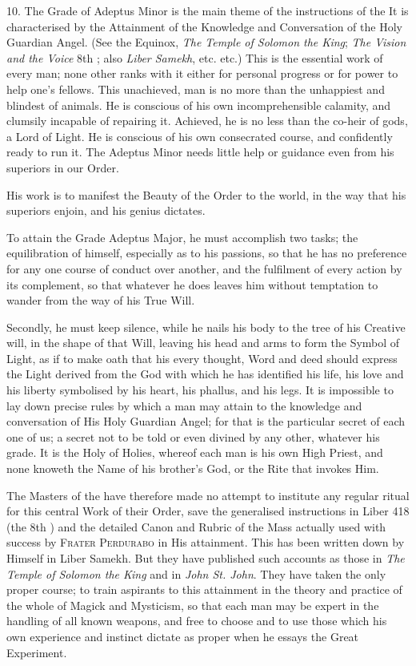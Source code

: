 \vspace{\baselineskip}

10. The Grade of Adeptus Minor is the main theme of the instructions of the \Argentium{} It is characterised by the Attainment of the Knowledge and Conversation of the Holy Guardian Angel. (See the Equinox, \textit{The Temple of Solomon the King}; \textit{The Vision and the Voice} 8th \AEthyr{}; also \textit{Liber Samekh}, etc. etc.) This is the essential work of every man; none other ranks with it either for personal progress or for power to help one's fellows. This unachieved, man is no more than the unhappiest and blindest of animals. He is conscious of his own incomprehensible calamity, and clumsily incapable of repairing it. Achieved, he is no less than the co-heir of gods, a Lord of Light. He is conscious of his own consecrated course, and confidently ready to run it. The Adeptus Minor needs little help or guidance even from his superiors in our Order.

His work is to manifest the Beauty of the Order to the world, in the way that his superiors enjoin, and his genius dictates.

To attain the Grade Adeptus Major, he must accomplish two tasks; the equilibration of himself, especially as to his passions, so that he has no preference for any one course of conduct over another, and the fulfilment of every action by its complement, so that whatever he does leaves him without temptation to wander from the way of his True Will.

Secondly, he must keep silence, while he nails his body to the tree of his Creative will, in the shape of that Will, leaving his head and arms to form the Symbol of Light, as if to make oath that his every thought, Word and deed should express the Light derived from the God with which he has identified his life, his love and his liberty \textemdash{} symbolised by his heart, his phallus, and his legs. It is impossible to lay down precise rules by which a man may attain to the knowledge and conversation of His Holy Guardian Angel; for that is the particular secret of each one of us; a secret not to be told or even divined by any other, whatever his grade. It is the Holy of Holies, whereof each man is his own High Priest, and none knoweth the Name of his brother's God, or the Rite that invokes Him.

The Masters of the \Argentium{} have therefore made no attempt to institute any regular ritual for this central Work of their Order, save the generalised instructions in Liber 418 (the 8th \AEthyr{}) and the detailed Canon and Rubric of the Mass actually used with success by \textsc{Frater Perdurabo} in His attainment. This has been written down by Himself in Liber Samekh. But they have published such accounts as those in \textit{The Temple of Solomon the King} and in \textit{John St. John}. They have taken the only proper course; to train aspirants to this attainment in the theory and practice of the whole of Magick and Mysticism, so that each man may be expert in the handling of all known weapons, and free to choose and to use those which his own experience and instinct dictate as proper when he essays the Great Experiment.

